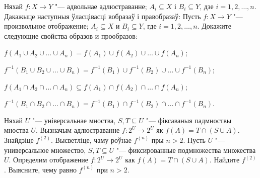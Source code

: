 




\begin{problemList}

\problemItemWithCommonPart
{Няхай $f \colon X \to Y$ "--- адвольнае адлюстраванне;
$A_i \subseteq X$ і $B_i \subseteq Y$, дзе $i = 1, 2, \ldots, n$.
Дакажыце наступныя ўласцівасці вобразаў і правобразаў:}
{Пусть $f \colon X \to Y$ "--- произвольное отображение;
$A_i \subseteq X$ и $B_i \subseteq Y$, где $i = 1, 2, \ldots, n$.
Докажите следующие свойства образов и прообразов:}
{%
\begin{belarusianEnumerate}

\item $f(A_1 \cup A_2 \cup \ldots \cup A_n) = f(A_1) \cup f(A_2) \cup \ldots \cup f(A_n)$;

\item $f^{-1}(B_1 \cup B_2 \cup \ldots \cup B_n) = f^{-1}(B_1) \cup f^{-1}(B_2) \cup \ldots \cup f^{-1}(B_n)$;

\item $f(A_1 \cap A_2 \cap \ldots \cap A_n) \subseteq f(A_1) \cap f(A_2) \cap \ldots \cap f(A_n)$;

\item $f^{-1}(B_1 \cap B_2 \cap \ldots \cap B_n) = f^{-1}(B_1) \cap f^{-1}(B_2) \cap \ldots \cap f^{-1}(B_n)$.

\end{belarusianEnumerate}
}

\bigskip

\problemItemSimple
{Няхай $U$ "--- універсальнае мноства, $S, T \subseteq U$ "--- фіксаваныя падмноствы мноства $U$. Вызначым адлюстраванне $f \colon 2^U \to 2^U$ як $f(A) = T \cap (S \cup A)$. Знайдзіце $f^{(2)}$. Высветліце, чаму роўнае $f^{(n)}$ пры $n > 2$.}
{Пусть $U$ "--- универсальное множество, $S, T \subseteq U$ "--- фиксированные подмножества множества $U$. Определим отображение $f \colon 2^U \to 2^U$ как $f(A) = T \cap (S \cup A)$. Найдите $f^{(2)}$. Выясните, чему равно $f^{(n)}$ при $n > 2$.}

\bigskip


\end{problemList}
